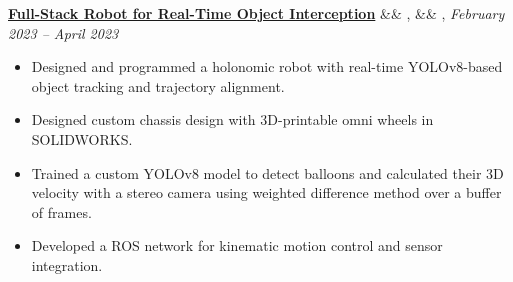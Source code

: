 \documentclass[letterpaper,10pt]{article}
\newcommand{\experience}[5]{%
    \noindent\textbf{#1}%
    \ifx&#2&
    \else
        , \textit{#2}%
    \fi
    \ifx&#3&
    \else
        , #3%
    \fi
    \hfill \textit{#4} \\
    \vspace{-6.8mm}%
    \begin{itemize}[itemsep=-5pt]
        \setlength{\itemindent}{0em}
        #5
    \end{itemize}
    \vspace{1mm}
}
\begin{document}
    
\experience
    {\href{https://ryanbarry.me/projects/robotics/omnidirectional-robot/}{Full-Stack Robot for Real-Time Object Interception}}
    {}
    {}
    {February 2023 – April 2023}
    {

        \item Designed and programmed a holonomic robot with real-time YOLOv8-based object tracking and trajectory alignment.
        \item Designed custom chassis design with 3D-printable omni wheels in SOLIDWORKS.
        \item Trained a custom YOLOv8 model to detect balloons and calculated their 3D velocity with a stereo camera using weighted difference method over a buffer of frames.
        \item Developed a ROS network for kinematic motion control and sensor integration.
    }
    
        
\end{document}
